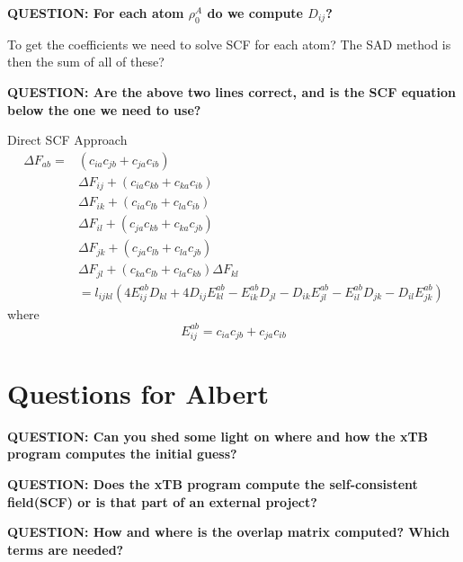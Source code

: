 \documentclass{article}
\newcommand{\q}[1]{\textbf{QUESTION: #1}}
\begin{document}
\q{For each atom \(\rho_0^A\) do we compute \(D_{ij}\)?}

To get the coefficients we need to solve SCF for each atom?
The SAD method is then the sum of all of these?

\q{Are the above two lines correct, and is the SCF equation below the one we need to use?}

Direct SCF Approach
\begin{equation}
\begin{split}
  \Delta F_{ab} = &(c_{ia}c_{jb} + c_{ja}c_{ib})\\
  &\Delta F_{ij} + (c_{ia}c_{kb} + c_{ka}c_{ib})\\
  &\Delta F_{ik} + (c_{ia}c_{lb} + c_{la}c_{ib})\\
  &\Delta F_{il} + (c_{ja}c_{kb} + c_{ka}c_{jb})\\
  &\Delta F_{jk} + (c_{ja}c_{lb} + c_{la}c_{jb})\\
  &\Delta F_{jl} + (c_{ka}c_{lb} + c_{la}c_{kb}) \Delta F_{kl}\\
  &= l_{ijkl}(4E_{ij}^{ab}D_{kl} + 4D_{ij}E_{kl}^{ab} - E_{ik}^{ab}D_{jl} - D_{ik}E_{jl}^{ab} - E_{il}^{ab}D_{jk} - D_{il}E_{jk}^{ab})
\end{split}
\end{equation}
where
\begin{equation}
  E_{ij}^{ab} = c_{ia}c_{jb} + c_{ja}c_{ib}
\end{equation}



\section{Questions for Albert}

\q{Can you shed some light on where and how the xTB program computes the initial guess?}

\vspace{10pt}
\noindent
\q{Does the xTB program compute the self-consistent field(SCF) or is that part of an external project?}

\vspace{10pt}
\noindent
\q{How and where is the overlap matrix computed? Which terms are needed?}
\end{document}
